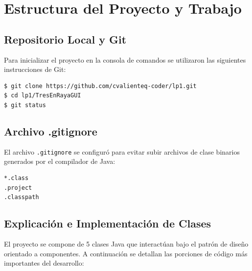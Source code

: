 \documentclass{article}
\begin{document}
\clearpage
 
\section{Estructura del Proyecto y Trabajo}
 
\subsection{Repositorio Local y Git}
Para inicializar el proyecto en la consola de comandos se utilizaron las siguientes instrucciones de Git:

\begin{lstlisting}[language=bash, caption={Clonación y estado del proyecto}]
$ git clone https://github.com/cvalienteq-coder/lp1.git
$ cd lp1/TresEnRayaGUI
$ git status
\end{lstlisting}

\subsection{Archivo .gitignore}
El archivo \texttt{.gitignore} se configuró para evitar subir archivos de clase binarios generados por el compilador de Java:
\begin{lstlisting}[language=bash, caption={Archivo .gitignore}]
*.class
.project
.classpath
\end{lstlisting}
 
\subsection{Explicación e Implementación de Clases}
 
El proyecto se compone de 5 clases Java que interactúan bajo el patrón de diseño orientado a componentes. A continuación se detallan las porciones de código más importantes del desarrollo:
\end{document}
